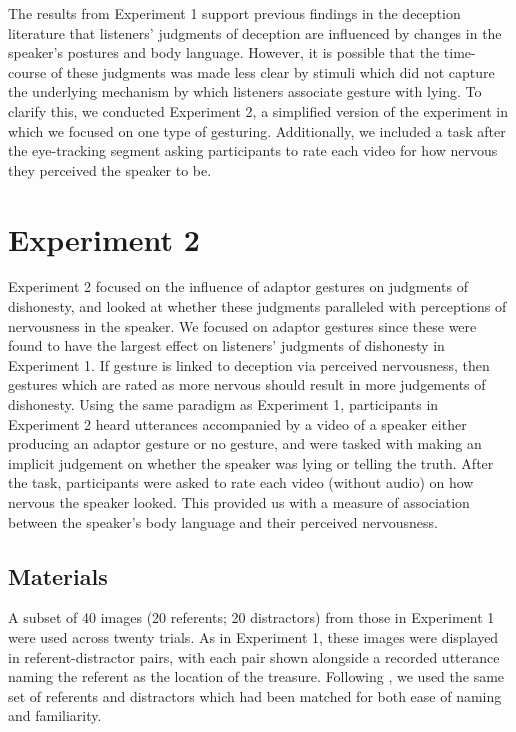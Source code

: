 \documentclass[a4paper,man,natbib]{apa6}
\begin{document}
The results from Experiment 1 support previous findings in the deception literature that listeners' judgments of deception are influenced by changes in the speaker's postures and body language. 
However, it is possible that the time-course of these judgments was made less clear by stimuli which did not capture the underlying mechanism by which listeners associate gesture with lying.
To clarify this, we conducted Experiment 2, a simplified version of the experiment in which we focused on one type of gesturing.
Additionally, we included a task after the eye-tracking segment asking participants to rate each video for how nervous they perceived the speaker to be. %

\section{Experiment 2}
Experiment 2 focused on the influence of adaptor gestures on judgments of dishonesty, and looked at whether these judgments paralleled with perceptions of nervousness in the speaker.
We focused on adaptor gestures since these were found to have the largest effect on listeners' judgments of dishonesty in Experiment 1. %
If gesture is linked to deception via perceived nervousness, then gestures which are rated as more nervous should result in more judgements of dishonesty. 
Using the same paradigm as Experiment 1, participants in Experiment 2 heard utterances accompanied by a video of a speaker either producing an adaptor gesture or no gesture, and were tasked with making an implicit judgement on whether the speaker was lying or telling the truth. %
After the task, participants were asked to rate each video (without audio) on how nervous the speaker looked.
This provided us with a measure of association between the speaker's body language and their perceived nervousness.

\subsection{Materials}
A subset of 40 images (20 referents; 20 distractors) from those in Experiment 1 were used across twenty trials.
As in Experiment 1, these images were displayed in referent-distractor pairs, with each pair shown alongside a recorded utterance naming the referent as the location of the treasure.
Following \citet{Loy2017}, we used the same set of referents and distractors which had been matched for both ease of naming and familiarity.
\end{document}
